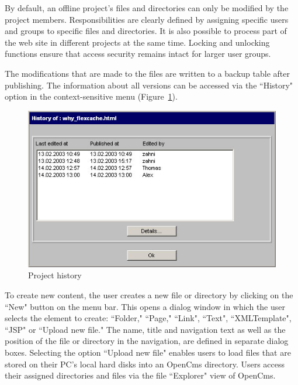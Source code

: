 By default, an offline project's files and directories can only be
modified by the project members. Responsibilities are clearly
defined by assigning specific users and groups to specific files
and directories. It is also possible to process part of the web
site in different projects at the same time. Locking and unlocking
functions ensure that access security remains intact for larger
user groups.

The modifications that are made to the files are written to a
backup table after publishing. The information about all versions can
be accessed via the ``History" option in the context-sensitive menu
(Figure~\ref{history01}).

\begin{figure}[!hbt]
\begin{center}
\includegraphics[width=\sgw]
                   {pics/usermanual/history01}
\caption[Project history]
           {Project history}
\label{history01}
\end{center}
\end{figure}

To create new content, the user creates a new file or directory by
clicking on the ``New" button on the menu bar. This opens a dialog
window in which the user selects the element to create: ``Folder,"
``Page," ``Link", ``Text", ``XMLTemplate", ``JSP" or ``Upload new file." The
name, title and navigation text as well as the position of the file
or directory in the navigation, are defined in separate dialog
boxes. Selecting the option ``Upload new file" enables users to load
files that are stored on their PC's local hard disks into an
OpenCms directory. Users access their assigned directories and
files via the file ``Explorer" view of OpenCms.

